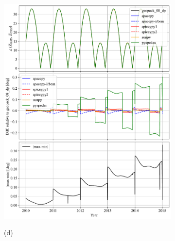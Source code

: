 \documentclass[draft]{agujournal2019}
\begin{document}
\begin{figure}[htb]
\begin{subfigure}[b]{0.49\textwidth}
         \includegraphics[width=\textwidth]{code/figures/angles/delta=1days_20100101-20150101/GSE_GSM.pdf}
     \end{subfigure}
     \begin{subfigure}[b]{0.49\textwidth}
         (d)
         \centering

\end{subfigure}
\end{figure}
\end{document}
